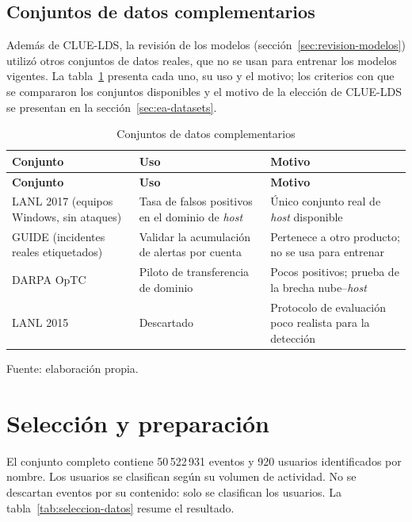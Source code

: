 \subsection{Conjuntos de datos complementarios}
\label{sec:datos-complementarios}
Además de CLUE-LDS, la revisión de los modelos (sección~\ref{sec:revision-modelos}) utilizó otros conjuntos de datos reales, que no se usan para entrenar los modelos vigentes. La tabla~\ref{tab:datos-complementarios} presenta cada uno, su uso y el motivo; los criterios con que se compararon los conjuntos disponibles y el motivo de la elección de CLUE-LDS se presentan en la sección~\ref{sec:ea-datasets}.

\begin{longtable}{>{\raggedright\arraybackslash}p{4.0cm}>{\raggedright\arraybackslash}p{4.6cm}>{\raggedright\arraybackslash}p{5.5cm}}
	\caption{Conjuntos de datos complementarios}
	\label{tab:datos-complementarios}\\
	\hline
	\textbf{Conjunto} & \textbf{Uso} & \textbf{Motivo} \\
	\hline
	\endfirsthead
	\hline
	\textbf{Conjunto} & \textbf{Uso} & \textbf{Motivo} \\
	\hline
	\endhead
	LANL 2017 (equipos Windows, sin ataques) \parencite{Turcotte2018LANL} & Tasa de falsos positivos en el dominio de \emph{host} & Único conjunto real de \emph{host} disponible \\
	\hline
	GUIDE (incidentes reales etiquetados) \parencite{Freitas2024GUIDE} & Validar la acumulación de alertas por cuenta & Pertenece a otro producto; no se usa para entrenar \\
	\hline
	DARPA OpTC \parencite{Arantes2021OpTC} & Piloto de transferencia de dominio & Pocos positivos; prueba de la brecha nube--\emph{host} \\
	\hline
	LANL 2015 \parencite{Kent2015} & Descartado & Protocolo de evaluación poco realista para la detección \parencite{Larroche2026} \\
	\hline
\end{longtable}
{\small Fuente: elaboración propia.\par}

\section{Selección y preparación}
\label{sec:seleccion-datos}
El conjunto completo contiene 50\,522\,931 eventos y 920 usuarios identificados por nombre. Los usuarios se clasifican según su volumen de actividad. No se descartan eventos por su contenido: solo se clasifican los usuarios. La tabla~\ref{tab:seleccion-datos} resume el resultado.

